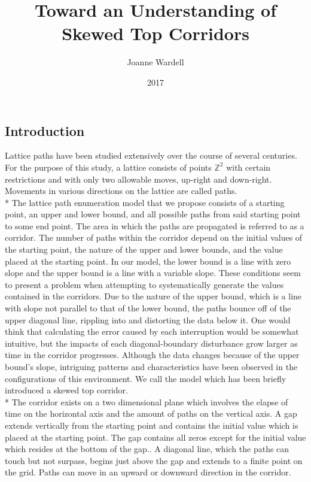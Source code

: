 \documentclass{article}
\title{Toward an Understanding of Skewed Top Corridors}
\author{Joanne Wardell}
\date{2017}
\newcommand*{\set}[1]{\mathbb{#1}}
\newcommand\tab[1][1cm]{\hspace*{#1}}
\begin{document}
\maketitle
\subsection*{Introduction}
\tab 
Lattice paths have been studied extensively over the course of several centuries. For the purpose of this study, a lattice consists of points $\set{Z}^{2}$ with certain restrictions and with only two allowable moves, up-right and
down-right.
Movements in various directions on the lattice are called paths.
\\*
\tab The lattice path enumeration model that we propose consists of a starting point, an upper and lower bound, and all possible paths from said starting point to some end point.
The area in which the paths are propagated is referred to as a corridor. The number of paths within the corridor depend on the initial values of the starting point, the nature of the upper and lower bounds, and the value placed at the
starting point. In our model, the lower bound is a line with zero slope and the upper bound is a line with a variable slope. These conditions seem to present a problem when attempting to systematically generate the values contained 
in the corridors. Due to the nature of the upper bound, which is a line with slope not parallel to that of the lower bound, the paths bounce off of the upper diagonal line, 
rippling into and distorting the data below it. One would think that calculating the error caused by each interruption would be somewhat intuitive, but the impacts of each diagonal-boundary disturbance grow larger as
time in the corridor progresses. Although the data changes because of the upper bound's slope, intriguing patterns and characteristics have been observed in the configurations of this environment. 
We call the model
which has been briefly introduced a skewed top corridor. \\*
\tab The corridor exists on a two dimensional plane which involves the elapse of time on the horizontal axis and the amount of paths on the vertical axis. A gap extends vertically from the starting point and contains the 
initial value which is placed at the starting point. The gap contains all zeros except for the initial value which resides at the bottom of the gap.. A diagonal line, which the paths can touch but 
not surpass, begins just above the gap and extends to a finite point on the grid. Paths can move in an upward or downward direction in the corridor.
\end{document}
